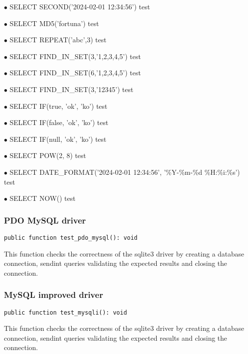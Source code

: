 \documentclass[a4paper]{article}
\begin{document}
\begin{compactitem}
\item[\color{myblue}$\bullet$] SELECT SECOND('2024-02-01 12:34:56') test
\item[\color{myblue}$\bullet$] SELECT MD5('fortuna') test
\item[\color{myblue}$\bullet$] SELECT REPEAT('abc',3) test
\item[\color{myblue}$\bullet$] SELECT FIND\_IN\_SET(3,'1,2,3,4,5') test
\item[\color{myblue}$\bullet$] SELECT FIND\_IN\_SET(6,'1,2,3,4,5') test
\item[\color{myblue}$\bullet$] SELECT FIND\_IN\_SET(3,'12345') test
\item[\color{myblue}$\bullet$] SELECT IF(true, 'ok', 'ko') test
\item[\color{myblue}$\bullet$] SELECT IF(false, 'ok', 'ko') test
\item[\color{myblue}$\bullet$] SELECT IF(null, 'ok', 'ko') test
\item[\color{myblue}$\bullet$] SELECT POW(2, 8) test
\item[\color{myblue}$\bullet$] SELECT DATE\_FORMAT('2024-02-01 12:34:56', '\%Y-\%m-\%d \%H:\%i:\%s') test
\item[\color{myblue}$\bullet$] SELECT NOW() test
\end{compactitem}

\hypertarget{toc134}{}
\subsubsection{PDO MySQL driver}

\begin{lstlisting}
public function test_pdo_mysql(): void
\end{lstlisting}

This function checks the correctness of the sqlite3 driver by creating a
database connection, sendint queries validating the expected results and
closing the connection.

\hypertarget{toc135}{}
\subsubsection{MySQL improved driver}

\begin{lstlisting}
public function test_mysqli(): void
\end{lstlisting}

This function checks the correctness of the sqlite3 driver by creating a
database connection, sendint queries validating the expected results and
closing the connection.
\end{document}
